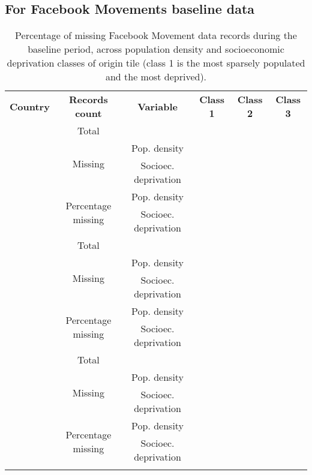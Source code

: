 \documentclass[
  11pt,
]{article}
\begin{document}
\subsection{For Facebook Movements baseline
data}\label{for-facebook-movements-baseline-data}

\begin{table}[ht]
 \centering 
 \captionsetup{width=\textwidth}
 \caption{Percentage of missing Facebook Movement data records during the baseline period, across population density and socioeconomic deprivation classes of origin tile (class 1 is the most sparsely populated and the most deprived).} 
 
\begin{tabular}{cccccc}
  \multirow{2}{*}{\textbf{Country}} & \multirow{2}{*}{\textbf{Records count}} & \multirow{2}{*}{\textbf{Variable}} & \multirow{2}{*}{\textbf{Class 1}} & \multirow{2}{*}{\textbf{Class 2}} & \multirow{2}{*}{\textbf{Class 3}}\\
  & & & & \\
  \Xhline{1.5pt}
   
  \multirow{5}{*}{ \;\; Argentina \;\; } & \;\;Total\;\; & & & & \\ 
  \cline{2-6}
  & \multirow{2}{*}{Missing} & \;\;Pop. density\;\; & & & \\
  & & \;\;Socioec. deprivation\;\; & & & \\
  \cline{2-6}
  & \multirow{2}{*}{Percentage missing} &  \;\;Pop. density\;\; & & & \\
  & & \;\;Socioec. deprivation\;\; & & & \\
  \Xhline{1.5pt}
  
  \multirow{5}{*}{ \;\; Chile \;\; } & \;\;Total\;\; & & & & \\ 
  \cline{2-6}
  & \multirow{2}{*}{Missing} & \;\;Pop. density\;\; & & & \\
  & & \;\;Socioec. deprivation\;\; & & & \\
  \cline{2-6}
  & \multirow{2}{*}{Percentage missing} &  \;\;Pop. density\;\; & & & \\
  & & \;\;Socioec. deprivation\;\; & & & \\
  \Xhline{1.5pt}
  
  \multirow{5}{*}{ \;\; Colombia \;\; } & \;\;Total\;\; & & & & \\ 
  \cline{2-6}
  & \multirow{2}{*}{Missing} & \;\;Pop. density\;\; & & & \\
  & & \;\;Socioec. deprivation\;\; & & & \\
  \cline{2-6}
  & \multirow{2}{*}{Percentage missing} &  \;\;Pop. density\;\; & & & \\
  & & \;\;Socioec. deprivation\;\; & & & \\
  \Xhline{1.5pt}
  

\end{tabular}
\end{table}
\end{document}
